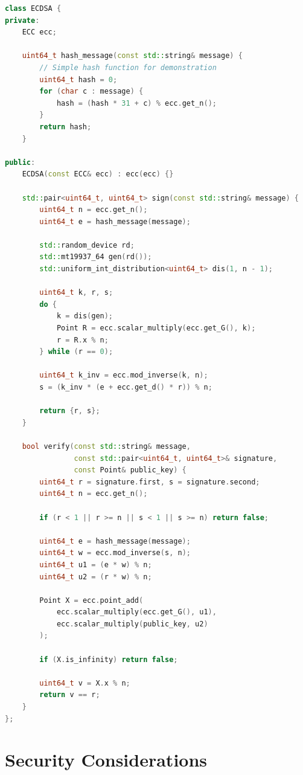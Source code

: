 \documentclass[11pt,a4paper]{article}
\begin{document}
\begin{lstlisting}[language=C++, caption=ECDSA Implementation]
class ECDSA {
private:
    ECC ecc;
    
    uint64_t hash_message(const std::string& message) {
        // Simple hash function for demonstration
        uint64_t hash = 0;
        for (char c : message) {
            hash = (hash * 31 + c) % ecc.get_n();
        }
        return hash;
    }
    
public:
    ECDSA(const ECC& ecc) : ecc(ecc) {}
    
    std::pair<uint64_t, uint64_t> sign(const std::string& message) {
        uint64_t n = ecc.get_n();
        uint64_t e = hash_message(message);
        
        std::random_device rd;
        std::mt19937_64 gen(rd());
        std::uniform_int_distribution<uint64_t> dis(1, n - 1);
        
        uint64_t k, r, s;
        do {
            k = dis(gen);
            Point R = ecc.scalar_multiply(ecc.get_G(), k);
            r = R.x % n;
        } while (r == 0);
        
        uint64_t k_inv = ecc.mod_inverse(k, n);
        s = (k_inv * (e + ecc.get_d() * r)) % n;
        
        return {r, s};
    }
    
    bool verify(const std::string& message, 
                const std::pair<uint64_t, uint64_t>& signature,
                const Point& public_key) {
        uint64_t r = signature.first, s = signature.second;
        uint64_t n = ecc.get_n();
        
        if (r < 1 || r >= n || s < 1 || s >= n) return false;
        
        uint64_t e = hash_message(message);
        uint64_t w = ecc.mod_inverse(s, n);
        uint64_t u1 = (e * w) % n;
        uint64_t u2 = (r * w) % n;
        
        Point X = ecc.point_add(
            ecc.scalar_multiply(ecc.get_G(), u1),
            ecc.scalar_multiply(public_key, u2)
        );
        
        if (X.is_infinity) return false;
        
        uint64_t v = X.x % n;
        return v == r;
    }
};
\end{lstlisting}

\section{Security Considerations}
\end{document}
